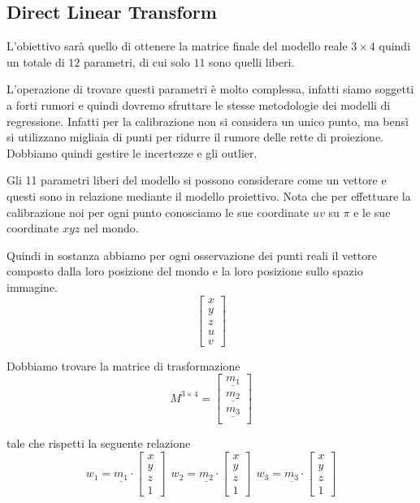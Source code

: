 \subsection{Direct Linear Transform} 
L'obiettivo sarà quello di ottenere la matrice finale del modello reale $3\times 4$
quindi un totale di $12$ parametri, di cui solo $11$ sono quelli liberi. 

L'operazione di trovare questi parametri è molto complessa, infatti siamo soggetti 
a forti rumori e quindi dovremo sfruttare le stesse metodologie dei modelli di 
regressione. Infatti per la calibrazione non si considera un unico punto, ma bensì
si utilizzano migliaia di punti per ridurre il rumore delle rette di proiezione.
Dobbiamo quindi gestire le incertezze e gli outlier.

Gli 11 parametri liberi del modello si possono considerare come un vettore e questi 
sono in relazione mediante il modello proiettivo. Nota che per effettuare la calibrazione 
noi per ogni punto conosciamo le sue coordinate $uv$ su $\pi$ e le sue coordinate 
$xyz$ nel mondo.

Quindi in sostanza abbiamo per ogni osservazione dei punti reali il vettore composto 
dalla loro posizione del mondo e la loro posizione sullo spazio immagine.
$$\left[\begin{array}{c}
    x\\y\\z\\u\\v
\end{array}\right]$$

Dobbiamo trovare la matrice di trasformazione 
$$M^{3\times 4} = \left[\begin{array}{c}
    \underline{m_1}\\
    \underline{m_2}\\
    \underline{m_3}\\
\end{array}\right]$$

tale che rispetti la seguente relazione 
$$w_1 = \underline{m_1} \cdot \left[\begin{array}{c}
    x\\y\\z\\1
\end{array}\right] \ \ w_2 = \underline{m_2} \cdot \left[\begin{array}{c}
    x\\y\\z\\1
\end{array}\right] \ \ w_3 = \underline{m_3} \cdot \left[\begin{array}{c}
    x\\y\\z\\1
\end{array}\right]$$

